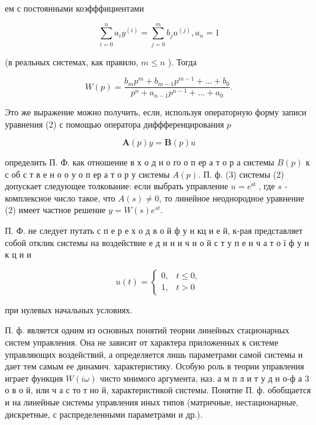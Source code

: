 \documentclass[10pt]{article}
\begin{document}
ем с постоянными коэфффициентами



\[

\sum_{i=0}^{n} a_{i} y^{(i)}=\sum_{j=0}^{m} b_{j} u^{(j)}, a_{n}=1

\]



(в реальных системах, как правило, $m \leqslant n$ ). Тогда



\[

W(p)=\frac{b_{m} p^{m}+b_{m-1} p^{m-1}+\ldots+b_{0}}{p^{n}+a_{n-1} p^{n-1}+\ldots+a_{0}} .

\]



Это же выражение можно получить, если, используя операторную форму записи уравнения (2) с помощью оператора диффференцирования $p$



\[

\boldsymbol{A}(p) y=\boldsymbol{B}(p) u

\]



определить П. Ф. как отношение в х о д н о го о п ер а т о р а системы $B(p)$ к с об с т в е н о о у о п ер а т о р у системы $A(p)$. П. ф. (3) системы (2) допускает следующее толкование: если выбрать управление $u=e^{\text {st }}$, где $s$ - комплексное число такое, что $A(s) \neq 0$, то линейное неоднородное уравнение (2) имеет частное решение $y=W(s) e^{s t}$.



П. Ф. не следует путать с п е р е х о д в о й ф у н кц и е й, к-рая представляет собой отклик системы на воздействие е д и н и ч н о й с т у п е н ч а т о ї ф у н к ц и и



\[

u(t)= \begin{cases}0, & t \leqslant 0, \\ 1, & t>0\end{cases}

\]



при нулевых начальных условиях.



П. ф. является одним из основных понятий теории линейных стационарных систем управления. Она не зависит от характера приложенных к системе управляющих воздействий, а определяется лишь параметрами самой системы и дает тем самым ее динамич. характеристику. Особую роль в теории управления играет функция $W(i \omega)$ чисто мнимого аргумента, наз. а м п л и т у д н о-ф а 3 о в о й, или ч а с то т но й, характеристикой системы. Понятие П. ф. обобщается и на линейные системы управления иных типов (матричные, нестационарные, дискретные, с распределенными параметрами и др.).
\end{document}
